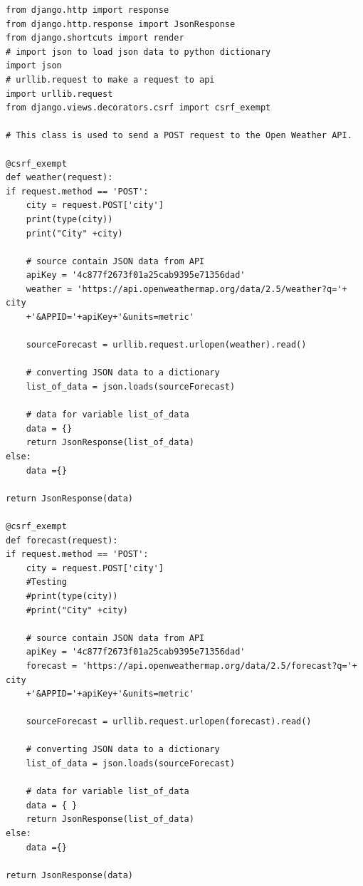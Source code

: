 \begin{verbatim}
from django.http import response
from django.http.response import JsonResponse
from django.shortcuts import render 
# import json to load json data to python dictionary 
import json 
# urllib.request to make a request to api 
import urllib.request 
from django.views.decorators.csrf import csrf_exempt

# This class is used to send a POST request to the Open Weather API. 

@csrf_exempt 
def weather(request): 
if request.method == 'POST': 
    city = request.POST['city']
    print(type(city))
    print("City" +city)
    
    # source contain JSON data from API 
    apiKey = '4c877f2673f01a25cab9395e71356dad'
    weather = 'https://api.openweathermap.org/data/2.5/weather?q='+ city
    +'&APPID='+apiKey+'&units=metric'

    sourceForecast = urllib.request.urlopen(weather).read() 

    # converting JSON data to a dictionary 
    list_of_data = json.loads(sourceForecast) 

    # data for variable list_of_data 
    data = {} 
    return JsonResponse(list_of_data)
else: 
    data ={} 

return JsonResponse(data)

@csrf_exempt 
def forecast(request): 
if request.method == 'POST': 
    city = request.POST['city']
    #Testing
    #print(type(city))
    #print("City" +city)
    
    # source contain JSON data from API 
    apiKey = '4c877f2673f01a25cab9395e71356dad'
    forecast = 'https://api.openweathermap.org/data/2.5/forecast?q='+ city 
    +'&APPID='+apiKey+'&units=metric'

    sourceForecast = urllib.request.urlopen(forecast).read() 

    # converting JSON data to a dictionary 
    list_of_data = json.loads(sourceForecast) 

    # data for variable list_of_data 
    data = { } 
    return JsonResponse(list_of_data)
else: 
    data ={} 

return JsonResponse(data)
\end{verbatim}

